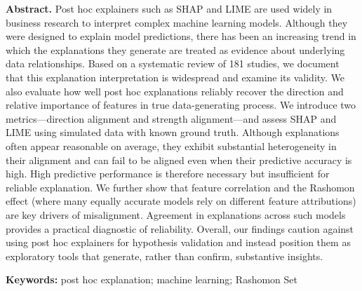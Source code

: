 \documentclass[11pt]{article}
\begin{document}
\noindent
\textbf{Abstract.}
Post hoc explainers such as SHAP and LIME are used widely in business research to interpret complex machine learning models. Although they were designed to explain model predictions, there has been an increasing trend in which the explanations they generate are treated as evidence about underlying data relationships. Based on a systematic review of 181 studies, we document that this explanation interpretation is widespread and examine its validity.
We also evaluate how well post hoc explanations reliably recover the direction and relative importance of features in true data-generating process. We introduce two metrics—direction alignment and strength alignment—and assess SHAP and LIME using simulated data with known ground truth. Although explanations often appear reasonable on average, they exhibit substantial heterogeneity in their alignment and can fail to be aligned even when their predictive accuracy is high. High predictive performance is therefore necessary but insufficient for reliable explanation.
We further show that feature correlation and the Rashomon effect (where many equally accurate models rely on different feature attributions) are key drivers of misalignment. Agreement in explanations across such models provides a practical diagnostic of reliability. Overall, our findings caution against using post hoc explainers for hypothesis validation and instead position them as exploratory tools that generate, rather than confirm, substantive insights.
\vspace{0.5em}

\noindent
\textbf{Keywords:}
post hoc explanation; machine learning; Rashomon Set




%




\end{document}
